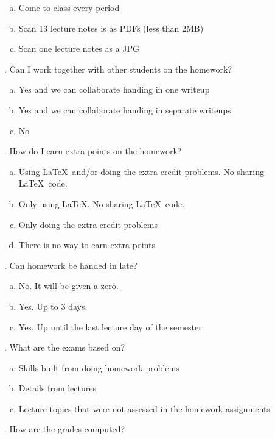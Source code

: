 \documentclass[12pt]{article}
\begin{document}
\begin{enumerate}[(a)]
\item Come to class every period
\item Scan 13 lecture notes is as PDFs (less than 2MB)
\item Scan one lecture notes as a JPG
\end{enumerate}

. Can I work together with other students on the homework?

\begin{enumerate}[(a)]
\item Yes and we can collaborate handing in one writeup
\item Yes and we can collaborate handing in separate writeups
\item No
\end{enumerate}

. How do I earn extra points on the homework?

\begin{enumerate}[(a)]
\item Using \LaTeX ~and/or doing the extra credit problems. No sharing \LaTeX~code.
\item Only using \LaTeX . No sharing \LaTeX~code.
\item Only doing the extra credit problems
\item There is no way to earn extra points
\end{enumerate}

. Can homework be handed in late?

\begin{enumerate}[(a)]
\item No. It will be given a zero.
\item Yes. Up to 3 days.
\item Yes. Up until the last lecture day of the semester.
\end{enumerate}


. What are the exams based on?

\begin{enumerate}[(a)]
\item Skills built from doing homework problems
\item Details from lectures
\item Lecture topics that were not assessed in the homework assignments
\end{enumerate}

. How are the grades computed?
\end{document}

